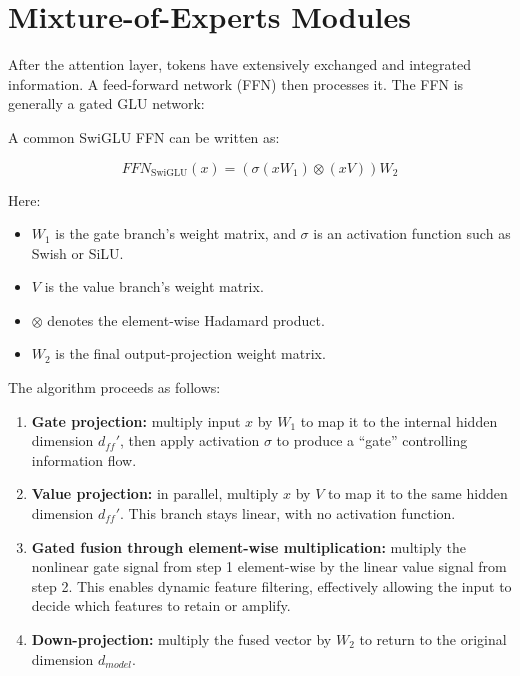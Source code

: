 \setcounter{section}{4}

\hypertarget{mixture-of-experts-modules}{%
\section{Mixture-of-Experts Modules}\label{mixture-of-experts-modules}}

After the attention layer, tokens have extensively exchanged and integrated information. A feed-forward network (FFN) then processes it. The FFN is generally a gated GLU network:

A common SwiGLU FFN can be written as:

\[
FFN_{\mathrm{SwiGLU}}(x) = (\sigma(xW_1) \otimes (xV))W_2
\]

Here:

\begin{itemize}
\tightlist
\item
  \(W_1\) is the gate branch's weight matrix, and \(\sigma\) is an activation function such as Swish or SiLU.
\item
  \(V\) is the value branch's weight matrix.
\item
  \(\otimes\) denotes the element-wise Hadamard product.
\item
  \(W_2\) is the final output-projection weight matrix.
\end{itemize}

The algorithm proceeds as follows:

\begin{enumerate}
\def\labelenumi{\arabic{enumi}.}
\tightlist
\item
  \textbf{Gate projection:} multiply input \(x\) by \(W_1\) to map it to the internal hidden dimension \(d_{ff}'\), then apply activation \(\sigma\) to produce a ``gate'' controlling information flow.
\item
  \textbf{Value projection:} in parallel, multiply \(x\) by \(V\) to map it to the same hidden dimension \(d_{ff}'\). This branch stays linear, with no activation function.
\item
  \textbf{Gated fusion through element-wise multiplication:} multiply the nonlinear gate signal from step 1 element-wise by the linear value signal from step 2. This enables dynamic feature filtering, effectively allowing the input to decide which features to retain or amplify.
\item
  \textbf{Down-projection:} multiply the fused vector by \(W_2\) to return to the original dimension \(d_{model}\).
\end{enumerate}

